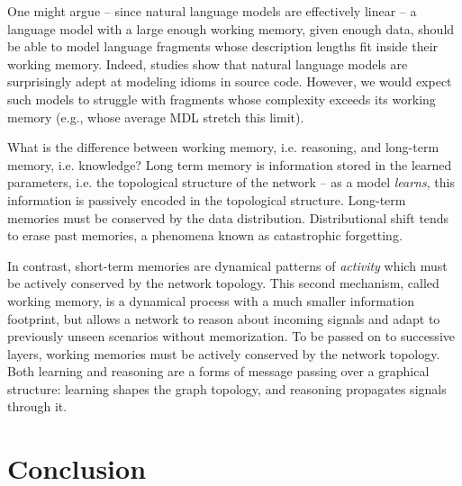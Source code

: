 \documentclass[12pt]{article}
\begin{document}
  One might argue -- since natural language models are effectively linear -- a language model with a large enough working memory, given enough data, should be able to model language fragments whose description lengths fit inside their working memory. Indeed, studies show that natural language models are surprisingly adept at modeling idioms in source code. However, we would expect such models to struggle with fragments whose complexity exceeds its working memory (e.g., whose average MDL stretch this limit).

What is the difference between working memory, i.e. reasoning, and long-term memory, i.e. knowledge? Long term memory is information stored in the learned parameters, i.e. the topological structure of the network -- as a model \textit{learns}, this information is passively encoded in the topological structure. Long-term memories must be conserved by the data distribution. Distributional shift tends to erase past memories, a phenomena known as catastrophic forgetting.

In contrast, short-term memories are dynamical patterns of \textit{activity} which must be actively conserved by the network topology. This second mechanism, called working memory, is a dynamical process with a much smaller information footprint, but allows a network to reason about incoming signals and adapt to previously unseen scenarios without memorization. To be passed on to successive layers, working memories must be actively conserved by the network topology. Both learning and reasoning are a forms of message passing over a graphical structure: learning shapes the graph topology, and reasoning propagates signals through it.



\section{Conclusion}
\end{document}
